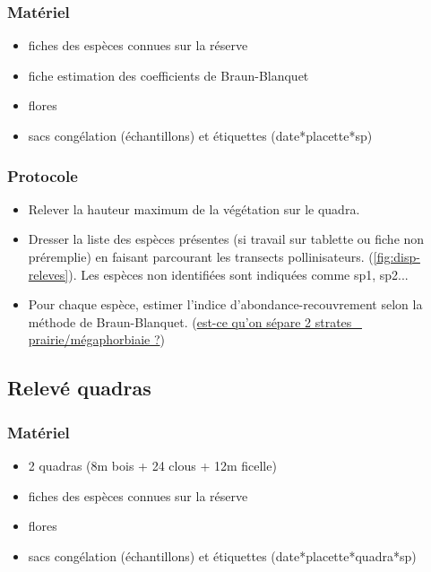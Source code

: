 \documentclass{article}
\begin{document}
	\subsubsection{Matériel}
	\begin{itemize}
		\item fiches des espèces connues sur la réserve
		\item fiche estimation des coefficients de Braun-Blanquet
		\item flores
		\item sacs congélation (échantillons) et étiquettes (date*placette*sp)
	\end{itemize}
	\subsubsection{Protocole}
	\begin{itemize}
		\item Relever la hauteur maximum de la végétation sur le quadra.
		\item Dresser la liste des espèces présentes (si travail sur tablette ou fiche non préremplie) en faisant parcourant les transects pollinisateurs. (\autoref{fig:disp-releves}). Les espèces non identifiées sont indiquées comme sp1, sp2...
		\item Pour chaque espèce, estimer l'indice d'abondance-recouvrement selon la méthode de Braun-Blanquet. (\underline{est-ce qu'on sépare 2 strates ~ prairie/mégaphorbiaie ?})
	\end{itemize}
	
	\subsection{Relevé quadras}
	\subsubsection{Matériel}
	\begin{itemize}
		\item 2 quadras (8m bois + 24 clous + 12m ficelle)
		\item fiches des espèces connues sur la réserve
		\item flores
		\item sacs congélation (échantillons) et étiquettes (date*placette*quadra*sp)
	\end{itemize}
\end{document}
